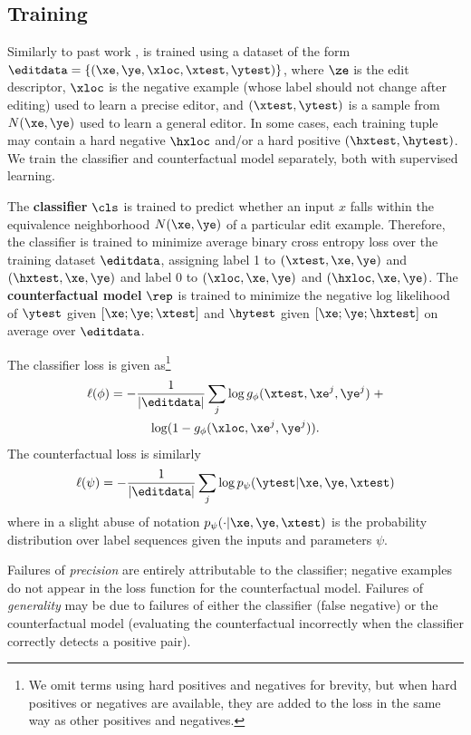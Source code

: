 \subsection{Training}
Similarly to past work \citep{Cao2021EditingFK,mitchell2021fast,hase2021language}, {\fullname} is trained using a dataset of the form $\editdata = \{(\xe,\ye,\xloc,\xtest,\ytest)\}$, where $\ze$ is the edit descriptor, $\xloc$ is the negative example (whose label should not change after editing) used to learn a precise editor, and $(\xtest, \ytest)$ is a sample from $N(\xe, \ye)$ used to learn a general editor. In some cases, each training tuple may contain a hard negative $\hxloc$ and/or a hard positive $(\hxtest, \hytest)$. We train the classifier and counterfactual model separately, both with supervised learning.

The \textbf{classifier} $\cls$ is trained to predict whether an input $x$ falls within the equivalence neighborhood $N(\xe, \ye)$ of a particular edit example. Therefore, the classifier is trained to minimize average binary cross entropy loss over the training dataset $\editdata$, assigning label 1 to $(\xtest, \xe, \ye)$ and $(\hxtest, \xe, \ye)$ and label 0 to $(\xloc, \xe, \ye)$ and $(\hxloc, \xe, \ye)$. The \textbf{counterfactual model} $\rep$ is trained to minimize the negative log likelihood of $\ytest$ given $[\xe; \ye; \xtest]$ and $\hytest$ given $[\xe; \ye; \hxtest]$ on average over $\editdata$.

The classifier loss is given as\footnote{We omit terms using hard positives and negatives for brevity, but when hard positives or negatives are available, they are added to the loss in the same way as other positives and negatives.}
\begin{multline}
\ell(\phi) = -\frac{1}{|\editdata|}\sum_j \log g_\phi(\xtest, \xe^j, \ye^j)\;+ \\
         \log (1 - g_\phi(\xloc, \xe^j, \ye^j)).
\end{multline}
The counterfactual loss is similarly
\begin{equation}
\ell(\psi) = -\frac{1}{|\editdata|}\sum_j \log p_\psi(\ytest | \xe, \ye, \xtest)
\end{equation}
where in a slight abuse of notation $p_\psi(\cdot | \xe, \ye, \xtest)$ is the probability distribution over label sequences given the inputs and parameters $\psi$.

Failures of \textit{precision} are entirely attributable to the classifier; negative examples do not appear in the loss function for the counterfactual model. Failures of \textit{generality} may be due to failures of either the classifier (false negative) or the counterfactual model (evaluating the counterfactual incorrectly when the classifier correctly detects a positive pair).


